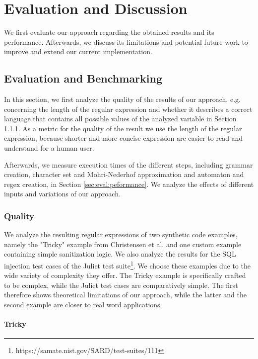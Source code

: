 \chapter{Evaluation and Discussion}
\label{chapter:Evaluation}

We first evaluate our approach regarding the obtained results and its performance. Afterwards, we discuss its limitations and potential future work to improve and extend our current implementation.

\section{Evaluation and Benchmarking}

In this section, we first analyze the quality of the results of our approach, e.g. concerning the length of the regular expression and whether it describes a correct language that contains all possible values of the analyzed variable in Section \ref{sec:eval:quality}. As a metric for the quality of the result we use the length of the regular expression, because shorter and more concise expression are easier to read and understand for a human user.

Afterwards, we measure execution times of the different steps, including grammar creation, character set and Mohri-Nederhof approximation and automaton and regex creation, in Section \ref{sec:eval:peformance}. We analyze the effects of different inputs and variations of our approach.

\subsection{Quality}\label{sec:eval:quality}

We analyze the resulting regular expressions of two synthetic code examples, namely the "Tricky" example from Christensen et al. \cite{brics} and one custom example containing simple sanitization logic. We also analyze the results for the SQL injection test cases of the Juliet test suite\footnote{https://samate.nist.gov/SARD/test-suites/111}. We choose these examples due to the wide variety of complexity they offer. The Tricky example is specifically crafted to be complex, while the Juliet test cases are comparatively simple. The first therefore shows theoretical limitations of our approach, while the latter and the second example are closer to real word applications.

\subsubsection{Tricky}\label{sec:eval:quality:tricky}

